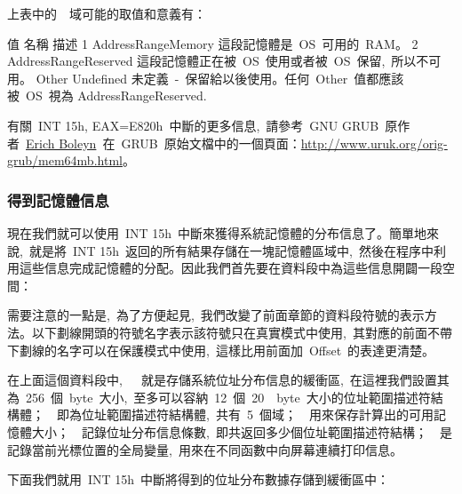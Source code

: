 上表中的~~域可能的取值和意義有：
\begin{Command}
值      名稱                     描述
1       AddressRangeMemory      這段記憶體是~OS~可用的~RAM。
2       AddressRangeReserved    這段記憶體正在被~OS~使用或者被~OS~保留,~所以不可用。
Other   Undefined               未定義~-~保留給以後使用。任何~Other~值都應該被~OS~視為                                          AddressRangeReserved.
\end{Command}

有關~INT 15h, EAX=E820h~中斷的更多信息,~請參考~GNU GRUB~原作者~\href{http://www.uruk.org/~erich/}{Erich Boleyn}~在~GRUB~原始文檔中的一個頁面：\url{http://www.uruk.org/orig-grub/mem64mb.html}。

\subsubsection{得到記憶體信息}

現在我們就可以使用~INT 15h~中斷來獲得系統記憶體的分布信息了。簡單地來說,~就是將~INT 15h~返回的所有結果存儲在一塊記憶體區域中,~然後在程序中利用這些信息完成記憶體的分配。因此我們首先要在資料段中為這些信息開闢一段空間：


需要注意的一點是,~為了方便起見,~我們改變了前面章節的資料段符號的表示方法。以下劃線開頭的符號名字表示該符號只在真實模式中使用,~其對應的前面不帶下劃線的名字可以在保護模式中使用,~這樣比用前面加~Offset~的表達更清楚。

在上面這個資料段中,~~~就是存儲系統位址分布信息的緩衝區,~在這裡我們設置其為~256~個~byte~大小,~至多可以容納~12~個~20~~byte~大小的位址範圍描述符結構體；~~即為位址範圍描述符結構體,~共有~5~個域；~~用來保存計算出的可用記憶體大小；~~記錄位址分布信息條數,~即共返回多少個位址範圍描述符結構；~~是記錄當前光標位置的全局變量,~用來在不同函數中向屏幕連續打印信息。

下面我們就用~INT 15h~中斷將得到的位址分布數據存儲到緩衝區中：


